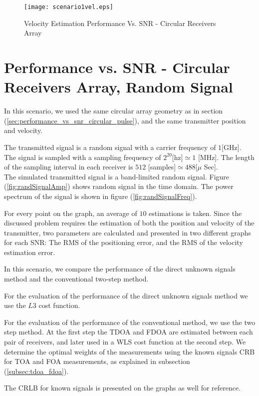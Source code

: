 \begin{figure}
\begin{center}
\texttt{[image: scenario1vel.eps]} 
\end{center}
\caption{Velocity Estimation Performance Vs. SNR - Circular Receivers Array}
\label{fig:scenario1_vel_rms}
\end{figure}

\section{Performance vs. SNR - Circular Receivers Array, Random Signal}

In this scenario, we used the same circular array geometry as in section (\ref{sec:performance_vs_snr_circular_pulse}), and the same transmitter position and velocity.

The transmitted signal is a random signal with a carrier frequency of $1$[GHz].
The signal is sampled with a sampling frequency of $2^{20}$[hz]$ \simeq 1$ [MHz].
The length of the sampling interval in each receiver is $512$ [samples]$ \simeq 488 $[$\mu$ Sec].\\
The simulated transmitted signal is a band-limited random signal.
Figure (\ref{fig:randSignalAmp}) shows random signal in the time domain. The power spectrum of the signal is shown in figure (\ref{fig:randSignalFreq}).

For every point on the graph, an average of $10$ estimations is taken.
Since the discussed problem requires the estimation of both the position and velocity of the transmitter, two parameters are calculated and presented in two different graphs for each SNR: The RMS of the positioning error, and the RMS of the velocity estimation error.

In this scenario, we compare the performance of the direct unknown signals method and the conventional two-step method.

For the evaluation of the performance of the direct unknown signals method we use the $L3$ cost function.

For the evaluation of the performance of the conventional method, we use the two step method.
At the first step the TDOA and FDOA are estimated between each pair of receivers, and later used in a WLS cost function at the second step. We determine the optimal weights of the measurements using the known signals CRB for TOA and FOA measurements, as explained in subsection (\ref{subsec:tdoa_fdoa}).

The CRLB for known signals is presented on the graphs as well for reference.


